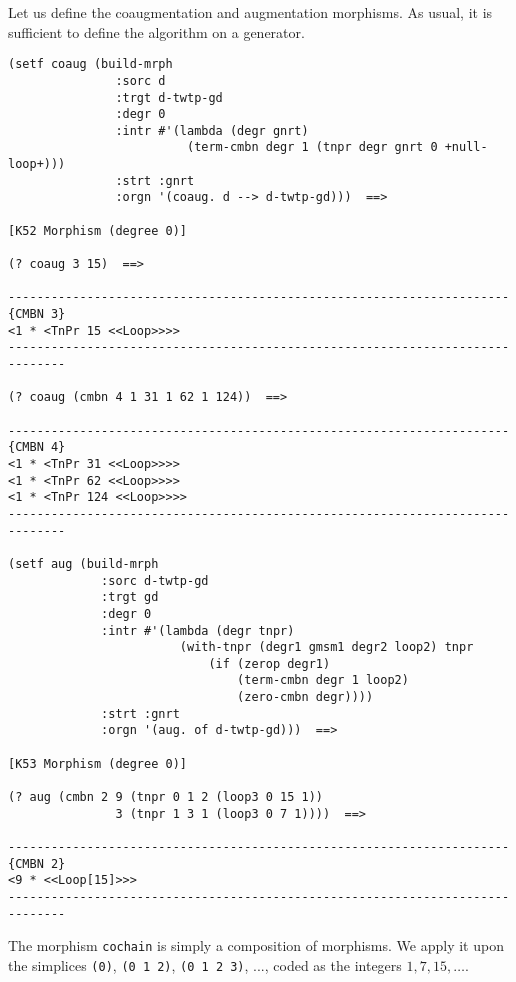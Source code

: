Let us define the  coaugmentation and augmentation morphisms. As usual, it is sufficient
to define the algorithm on a generator.
{\footnotesize\begin{verbatim}
(setf coaug (build-mrph
               :sorc d
               :trgt d-twtp-gd
               :degr 0
               :intr #'(lambda (degr gnrt)
                         (term-cmbn degr 1 (tnpr degr gnrt 0 +null-loop+)))
               :strt :gnrt
               :orgn '(coaug. d --> d-twtp-gd)))  ==>

[K52 Morphism (degree 0)]

(? coaug 3 15)  ==>

----------------------------------------------------------------------{CMBN 3}
<1 * <TnPr 15 <<Loop>>>>
------------------------------------------------------------------------------

(? coaug (cmbn 4 1 31 1 62 1 124))  ==>

----------------------------------------------------------------------{CMBN 4}
<1 * <TnPr 31 <<Loop>>>>
<1 * <TnPr 62 <<Loop>>>>
<1 * <TnPr 124 <<Loop>>>>
------------------------------------------------------------------------------

(setf aug (build-mrph
             :sorc d-twtp-gd
             :trgt gd
             :degr 0
             :intr #'(lambda (degr tnpr)
                        (with-tnpr (degr1 gmsm1 degr2 loop2) tnpr
                            (if (zerop degr1)
                                (term-cmbn degr 1 loop2)
                                (zero-cmbn degr))))
             :strt :gnrt
             :orgn '(aug. of d-twtp-gd)))  ==>

[K53 Morphism (degree 0)]

(? aug (cmbn 2 9 (tnpr 0 1 2 (loop3 0 15 1))
               3 (tnpr 1 3 1 (loop3 0 7 1))))  ==>

----------------------------------------------------------------------{CMBN 2}
<9 * <<Loop[15]>>>
------------------------------------------------------------------------------
\end{verbatim}}
The morphism {\tt cochain} is simply a composition of morphisms.
We apply it upon the simplices {\tt (0)},
{\tt (0 1 2)}, {\tt (0 1 2 3)}, ...,
coded as the integers $1,7,15,\ldots$.
